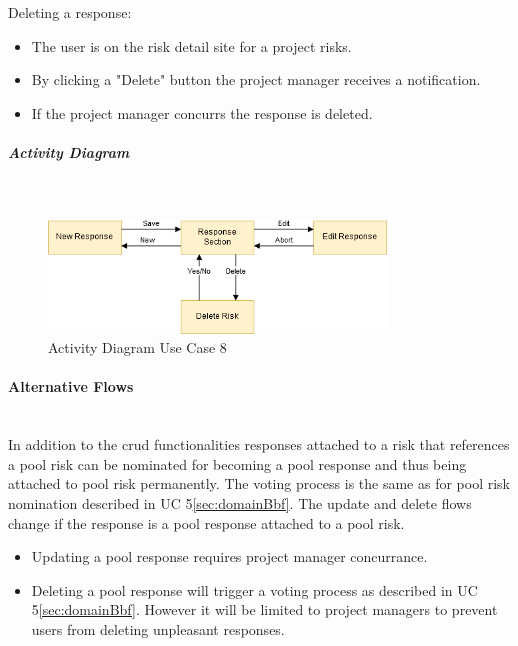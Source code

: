 \noindent
Deleting a response:
\begin{itemize}
	\vspace{-3mm}
	\setlength\itemsep{-1em}
	\item The user is on the risk detail site for a project risks.
	\item By clicking a "Delete" button the project manager receives a notification.
	\item If the project manager concurrs the response is deleted.
\end{itemize}


\subparagraph{Activity Diagram}\mbox{}\\
\begin{figure}[h]
	\centering
	\includegraphics[width=0.8\textwidth]{Content/Domain/UC8RiskResponseCRUDactivitydiagram}
	\caption{Activity Diagram Use Case 8}
	\label{fig:label88}
\end{figure}

\paragraph*{Alternative Flows}\mbox{}\\
In addition to the crud functionalities responses attached to a risk that references a pool risk can be nominated for becoming a pool response and thus being attached to pool risk permanently. The voting process is the same as for pool risk nomination described in UC 5\ref{sec:domainBbf}.
The update and delete flows change if the response is a pool response attached to a pool risk.
\begin{itemize}
	\vspace{-3mm}
	\setlength\itemsep{-1em}
	\item Updating a pool response requires project manager concurrance.
	\item Deleting a pool response will trigger a voting process as described in UC 5\ref{sec:domainBbf}. However it will be limited to project managers to prevent users from deleting unpleasant responses.
\end{itemize}


